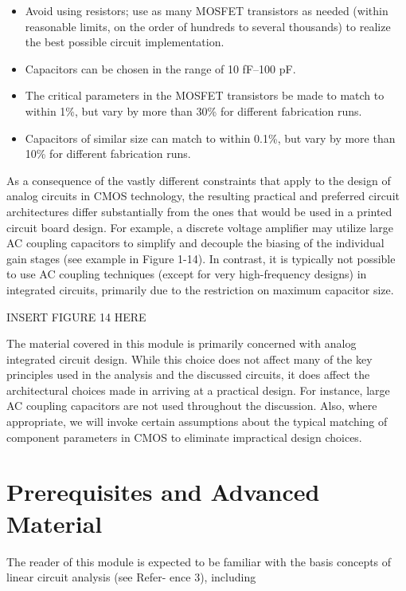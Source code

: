 \documentclass[
  11pt,
  letterpaper,
  abstract]{scrbook}
\begin{document}
\begin{itemize}
\item
  Avoid using resistors; use as many MOSFET transistors as needed
  (within reasonable limits, on the order of hundreds to several
  thousands) to realize the best possible circuit implementation.
\item
  Capacitors can be chosen in the range of 10 fF--100 pF.
\item
  The critical parameters in the MOSFET transistors be made to match to
  within 1\%, but vary by more than 30\% for different fabrication runs.
\item
  Capacitors of similar size can match to within 0.1\%, but vary by more
  than 10\% for different fabrication runs.
\end{itemize}

As a consequence of the vastly different constraints that apply to the
design of analog circuits in CMOS technology, the resulting practical
and preferred circuit architectures differ substantially from the ones
that would be used in a printed circuit board design. For example, a
discrete voltage amplifier may utilize large AC coupling capacitors to
simplify and decouple the biasing of the individual gain stages (see
example in Figure 1-14). In contrast, it is typically not possible to
use AC coupling techniques (except for very high-frequency designs) in
integrated circuits, primarily due to the restriction on maximum
capacitor size.

INSERT FIGURE 14 HERE

The material covered in this module is primarily concerned with analog
integrated circuit design. While this choice does not affect many of the
key principles used in the analysis and the discussed circuits, it does
affect the architectural choices made in arriving at a practical design.
For instance, large AC coupling capacitors are not used throughout the
discussion. Also, where appropriate, we will invoke certain assumptions
about the typical matching of component parameters in CMOS to eliminate
impractical design choices.

\section{Prerequisites and Advanced
Material}\label{prerequisites-and-advanced-material}

The reader of this module is expected to be familiar with the basis
concepts of linear circuit analysis (see Refer- ence 3), including
\end{document}
